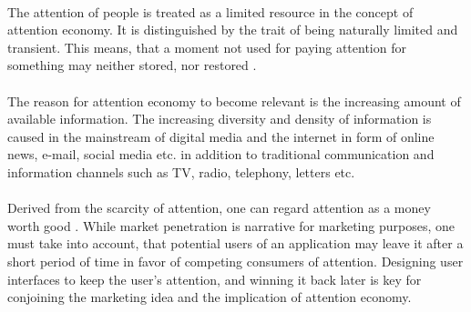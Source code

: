 \paragraph*{} The attention of people is treated as a limited resource in the concept of attention economy. It is distinguished by the trait of being naturally limited and transient. This means, that a moment not used for paying attention for something may neither stored, nor restored \parencite[cf.][]{Davenport.2001}.

\paragraph*{} The reason for attention economy to become relevant is the increasing amount of available information. The increasing diversity and density of information is caused in the mainstream of digital media and the internet in form of online news, e-mail, social media etc. in addition to traditional communication and information channels such as TV, radio, telephony, letters etc.

\paragraph*{} Derived from the scarcity of attention, one can regard attention as a money worth good \parencite[cf.][]{Davenport.2001}. While market penetration is narrative for marketing purposes, one must take into account, that potential users of an application may leave it after a short period of time in favor of competing consumers of attention. Designing user interfaces to keep the user's attention, and winning it back later is key for conjoining the marketing idea and the implication of attention economy.